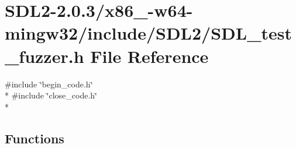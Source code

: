 \hypertarget{x86__64-w64-mingw32_2include_2SDL2_2SDL__test__fuzzer_8h}{\section{S\+D\+L2-\/2.0.3/x86\+\_-\/w64-\/mingw32/include/\+S\+D\+L2/\+S\+D\+L\+\_\+test\+\_\+fuzzer.h File Reference}
\label{x86__64-w64-mingw32_2include_2SDL2_2SDL__test__fuzzer_8h}
}
{\ttfamily \#include \char`\"{}begin\+\_\+code.\+h\char`\"{}}\\*
{\ttfamily \#include \char`\"{}close\+\_\+code.\+h\char`\"{}}\\*
\subsection*{Functions}
